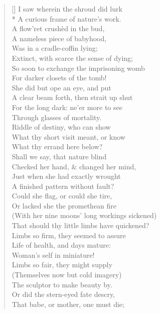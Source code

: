 \documentclass[MAIN]{subfiles}
\begin{document}
\settowidth{\versewidth}{I saw wherein the shroud did lurk}
\begin{verse}[\versewidth]
I saw wherein the shroud did lurk\\*
A curious frame of nature's work.\\
A flow'ret crush\`ed in the bud,\\
A nameless piece of babyhood,\\
Was in a cradle-coffin lying;\\
Extinct, with scarce the sense of dying;\\
So soon to exchange the imprisoning womb\\
For darker closets of the tomb!\\
She did but ope an eye, and put\\
A clear beam forth, then strait up shut\\
For the long dark: ne'er more to see\\
Through glasses of mortality.\\
Riddle of destiny, who can show\\
What thy short visit meant, or know\\
What thy errand here below?\\
Shall we say, that nature blind\\
Checked her hand, \& changed her mind,\\
Just when she had exactly wrought\\
A finished pattern without fault?\\
Could she flag, or could she tire,\\
Or lacked she the promethean fire\\
(With her nine moons' long workings sickened)\\
That should thy little limbs have quickened?\\
Limbs so firm, they seemed to assure\\
Life of health, and days mature:\\
Woman's self in miniature!\\
Limbs so fair, they might supply\\
(Themselves now but cold imagery)\\
The sculptor to make beauty by.\\
Or did the stern-eyed fate descry,\\
That babe, or mother, one must die;\\

\end{verse}
\end{document}
